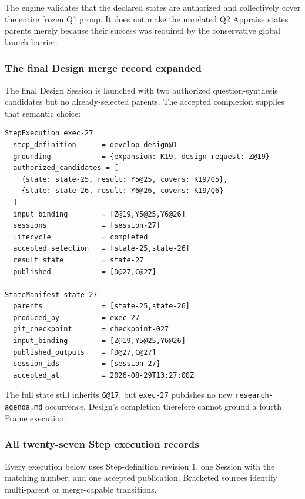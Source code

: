\documentclass[11pt]{article}
\newcommand{\artifact}[1]{\texttt{#1}}
\begin{document}
The engine validates that the declared states are authorized and collectively
cover the entire frozen Q1 group. It does not make the unrelated Q2 Appraise
states parents merely because their success was required by the conservative
global launch barrier.

\subsubsection{The final Design merge record expanded}

The final Design Session is launched with two authorized question-synthesis
candidates but no already-selected parents. The accepted completion supplies
that semantic choice:

\begin{lstlisting}[style=playbook,basicstyle=\ttfamily\scriptsize]
StepExecution exec-27
  step_definition      = develop-design@1
  grounding            = {expansion: K19, design request: Z@19}
  authorized_candidates = [
    {state: state-25, result: Y5@25, covers: K19/Q5},
    {state: state-26, result: Y6@26, covers: K19/Q6}
  ]
  input_binding        = [Z@19,Y5@25,Y6@26]
  sessions             = [session-27]
  lifecycle            = completed
  accepted_selection   = [state-25,state-26]
  result_state         = state-27
  published            = [D@27,C@27]

StateManifest state-27
  parents              = [state-25,state-26]
  produced_by          = exec-27
  git_checkpoint       = checkpoint-027
  input_binding        = [Z@19,Y5@25,Y6@26]
  published_outputs    = [D@27,C@27]
  session_ids          = [session-27]
  accepted_at          = 2026-08-29T13:27:00Z
\end{lstlisting}

The full state still inherits \texttt{G@17}, but \texttt{exec-27} publishes no
new \artifact{research-agenda.md} occurrence. Design's completion therefore
cannot ground a fourth Frame execution.

\subsubsection{All twenty-seven Step execution records}

Every execution below uses Step-definition revision 1, one Session with the
matching number, and one accepted publication. Bracketed sources identify
multi-parent or merge-capable transitions.
\end{document}
